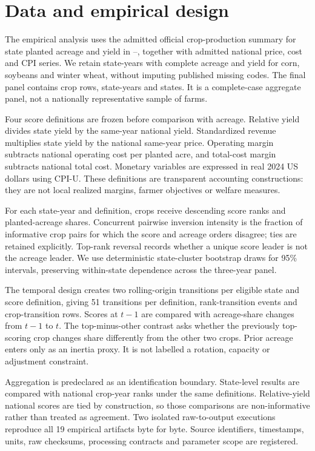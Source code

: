 \section{Data and empirical design}

The empirical analysis uses the admitted official crop-production summary for state planted acreage and yield in \EmpiricalStartYear--\EmpiricalEndYear, together with admitted national price, cost and CPI series. We retain state-years with complete acreage and yield for corn, soybeans and winter wheat, without imputing published missing codes. The final panel contains \NCropRows{} crop rows, \NStateYears{} state-years and \NStates{} states. It is a complete-case aggregate panel, not a nationally representative sample of farms.

Four score definitions are frozen before comparison with acreage. Relative yield divides state yield by the same-year national yield. Standardized revenue multiplies state yield by the national same-year price. Operating margin subtracts national operating cost per planted acre, and total-cost margin subtracts national total cost. Monetary variables are expressed in real 2024 US dollars using CPI-U. These definitions are transparent accounting constructions: they are not local realized margins, farmer objectives or welfare measures.

For each state-year and definition, crops receive descending score ranks and planted-acreage shares. Concurrent pairwise inversion intensity is the fraction of informative crop pairs for which the score and acreage orders disagree; ties are retained explicitly. Top-rank reversal records whether a unique score leader is not the acreage leader. We use \BootstrapReplications{} deterministic state-cluster bootstrap draws for 95\% intervals, preserving within-state dependence across the three-year panel.

The temporal design creates two rolling-origin transitions per eligible state and score definition, giving 51 transitions per definition, \TransitionEvents{} rank-transition events and \CropTransitionRows{} crop-transition rows. Scores at $t-1$ are compared with acreage-share changes from $t-1$ to $t$. The top-minus-other contrast asks whether the previously top-scoring crop changes share differently from the other two crops. Prior acreage enters only as an inertia proxy. It is not labelled a rotation, capacity or adjustment constraint.

Aggregation is predeclared as an identification boundary. State-level results are compared with national crop-year ranks under the same definitions. Relative-yield national scores are tied by construction, so those comparisons are non-informative rather than treated as agreement. Two isolated raw-to-output executions reproduce all 19 empirical artifacts byte for byte. Source identifiers, timestamps, units, raw checksums, processing contracts and parameter scope are registered.


